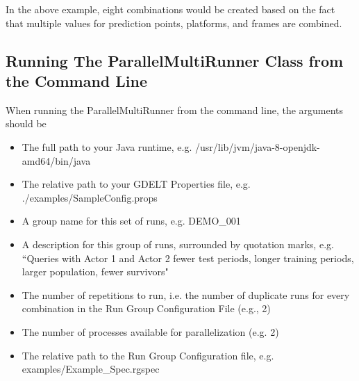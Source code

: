 In the above example, eight combinations would be created based on the fact that multiple values for prediction points, platforms, and frames are combined.

\subsection{Running The ParallelMultiRunner Class from the Command Line}

When running the ParallelMultiRunner from the command line, the arguments should be
\begin{itemize}
\item The full path to your Java runtime, e.g. /usr/lib/jvm/java-8-openjdk-amd64/bin/java 
\item The relative path to your GDELT Properties file, e.g. ./examples/SampleConfig.props 
\item A group name for this set of runs, e.g. DEMO\_001 
\item A description for this group of runs, surrounded by quotation marks, e.g. ``Queries with  Actor 1 and Actor 2 fewer test periods, longer training periods, larger population, fewer survivors"
\item The number of repetitions to run, i.e. the number of duplicate runs for every combination in the Run Group Configuration File (e.g., 2)
\item The number of processes available for parallelization (e.g. 2)
\item The relative path to the Run Group Configuration file, e.g. examples/Example\_Spec.rgspec
\end{itemize}

